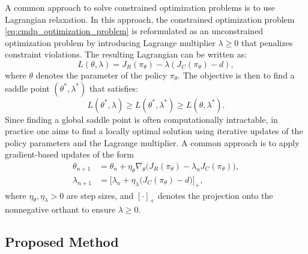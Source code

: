 A common approach to solve constrained optimization problems is to use Lagrangian relaxation.
In this approach, the constrained optimization problem \eqref{eq:cmdp_optimization_problem} is reformulated as an unconstrained optimization problem by introducing Lagrange multiplier $\lambda \geq 0$ that penalizes constraint violations.
The resulting Lagrangian can be written as:
\begin{equation}
    L(\theta, \lambda) = J_R(\pi_\theta) - \lambda (J_C(\pi_\theta) - d),
\end{equation}
where $\theta$ denotes the parameter of the policy $\pi_\theta$.
The objective is then to find a saddle point $(\theta^*, \lambda^*)$ that satisfies:
\begin{equation}
    L(\theta^*, \lambda) \geq L(\theta^*, \lambda^*) \geq L(\theta, \lambda^*).
\end{equation}
Since finding a global saddle point is often computationally intractable, in practice one aims to find a locally optimal solution using iterative updates of the policy parameters and the Lagrange multiplier. 
A common approach is to apply gradient-based updates of the form
\begin{align}
    \theta_{n+1} &= \theta_n + \eta_\theta \nabla_\theta \Big(J_R(\pi_\theta) - \lambda_n J_C(\pi_\theta)\Big), \\
    \lambda_{n+1} &= \Big[ \lambda_n + \eta_\lambda \big( J_C(\pi_\theta) - d \big) \Big]_+,
\end{align}
where $\eta_\theta, \eta_\lambda > 0$ are step sizes, and $[\cdot]_+$ denotes the projection onto the nonnegative orthant to ensure $\lambda \geq 0$.



\subsection{Proposed Method}


